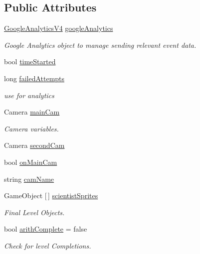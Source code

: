 \subsection*{Public Attributes}
\begin{DoxyCompactItemize}
\item 
\hyperlink{class_google_analytics_v4}{Google\+Analytics\+V4} \hyperlink{class_global_controller_a07eab03323734ee3d6bb98fbcd74631d}{google\+Analytics}
\begin{DoxyCompactList}\small\item\em Google Analytics object to manage sending relevant event data. \end{DoxyCompactList}\item 
bool \hyperlink{class_global_controller_a2ba8216c6a7ce8c86fac9109f862f987}{time\+Started}
\item 
long \hyperlink{class_global_controller_a62c9cd6f677068c5ee01ee2d111dc1e0}{failed\+Attempts}
\begin{DoxyCompactList}\small\item\em use for analytics \end{DoxyCompactList}\item 
Camera \hyperlink{class_global_controller_a5306f034de74eb967dcb2ac69f65dc1b}{main\+Cam}
\begin{DoxyCompactList}\small\item\em Camera variables. \end{DoxyCompactList}\item 
Camera \hyperlink{class_global_controller_a5a49301b40b343a34455602a61352f38}{second\+Cam}
\item 
bool \hyperlink{class_global_controller_a38a9c134634e25115dbaabe0599402c5}{on\+Main\+Cam}
\item 
string \hyperlink{class_global_controller_a9d3bd43867859b70cddd42139c588884}{cam\+Name}
\item 
Game\+Object \mbox{[}$\,$\mbox{]} \hyperlink{class_global_controller_a562bed7b82ef0ae6b84ef6bbc061fcd2}{scientist\+Sprites}
\begin{DoxyCompactList}\small\item\em Final Level Objects. \end{DoxyCompactList}\item 
bool \hyperlink{class_global_controller_adb1a210e3781f70338fb7e41bbf27bf5}{arith\+Complete} = false
\begin{DoxyCompactList}\small\item\em Check for level Completions. \end{DoxyCompactList}\item 

\end{DoxyCompactItemize}
